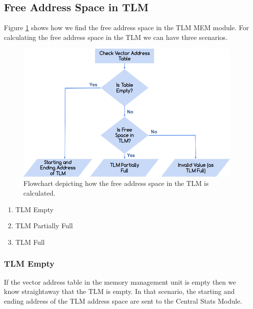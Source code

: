 \documentclass{listhesis}
\begin{document}
\subsection{Free Address Space in TLM}
Figure \ref{fig:freeSpaceTLM} shows how we find the free address space in the TLM MEM module. For calculating the free address space in the TLM we can have three scenarios. 
\begin{figure}
  \includegraphics[width=\linewidth]{freespace.png}
  \centering
  \caption{Flowchart depicting how the free address space in the TLM is calculated.}
  \label{fig:freeSpaceTLM}
\end{figure}
\begin{enumerate}
  \item TLM Empty 
  \item TLM Partially Full
  \item TLM Full
\end{enumerate}
\subsubsection{TLM Empty}
If the vector address table in the memory management unit is empty then we know straightaway that the TLM is empty. In that scenario, the starting and ending address of the TLM address space are sent to the Central Stats Module.\\ 
\end{document}
